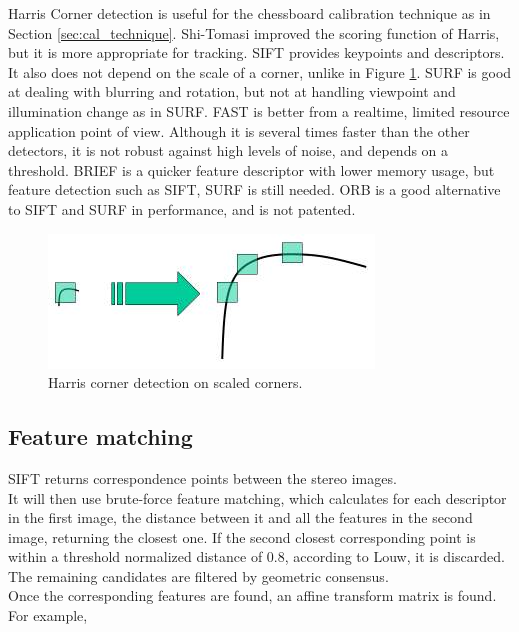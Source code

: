 Harris Corner detection is useful for the chessboard calibration technique as in Section \ref{sec:cal_technique}. Shi-Tomasi improved the scoring function of Harris, but it is more appropriate for tracking. SIFT provides keypoints and descriptors. It also does not depend on the scale of a corner, unlike in Figure \ref{fig:sift_scale}. SURF is good at dealing with blurring and rotation, but not at handling viewpoint and illumination change as in SURF. FAST is better from a realtime, limited resource application point of view. Although it is several times faster than the other detectors, it is not robust against high levels of noise, and depends on a threshold. BRIEF is a quicker feature descriptor with lower memory usage, but feature detection such as SIFT, SURF is still needed. ORB is a good alternative to SIFT and SURF in performance, and is not patented.\\

\begin{figure}[H]
\centering
\includegraphics[scale=0.5]{images/sift_scale_invariant.jpg}
\caption{Harris corner detection on scaled corners. \cite{calib3d}}
\label{fig:sift_scale}
\end{figure}

\subsection{Feature matching}

SIFT returns correspondence points between the stereo images.\\


It will then use brute-force feature matching, which calculates for each descriptor in the first image, the distance between it and all the features in the second image, returning the closest one. If the second closest corresponding point is within a threshold normalized distance of 0.8, according to Louw, it is discarded. The remaining candidates are filtered by geometric consensus.\\

Once the corresponding features are found, an affine transform matrix is found. For example,


